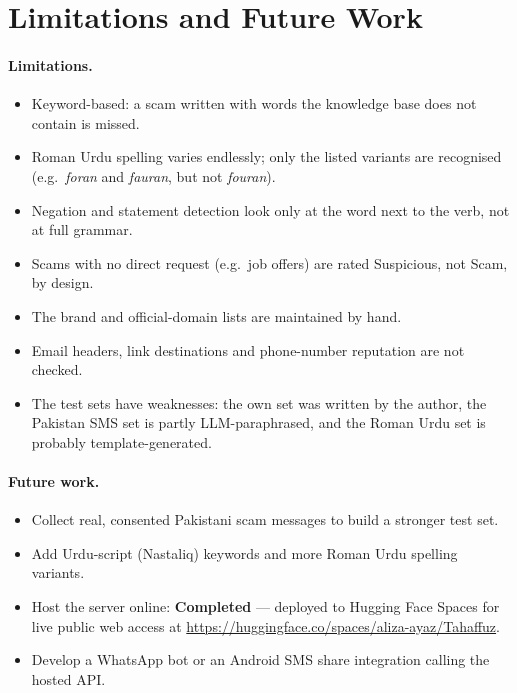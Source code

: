 \documentclass[11pt,a4paper]{article}
\begin{document}
\section{Limitations and Future Work}

\paragraph{Limitations.}
\begin{itemize}
  \item Keyword-based: a scam written with words the knowledge base does not contain is missed.
  \item Roman Urdu spelling varies endlessly; only the listed variants are recognised
        (e.g.\ \emph{foran} and \emph{fauran}, but not \emph{fouran}).
  \item Negation and statement detection look only at the word next to the verb, not at full grammar.
  \item Scams with no direct request (e.g.\ job offers) are rated Suspicious, not Scam, by design.
  \item The brand and official-domain lists are maintained by hand.
  \item Email headers, link destinations and phone-number reputation are not checked.
  \item The test sets have weaknesses: the own set was written by the author, the Pakistan SMS set is
        partly LLM-paraphrased, and the Roman Urdu set is probably template-generated.
\end{itemize}

\paragraph{Future work.}
\begin{itemize}
  \item Collect real, consented Pakistani scam messages to build a stronger test set.
  \item Add Urdu-script (Nastaliq) keywords and more Roman Urdu spelling variants.
  \item Host the server online: \textbf{Completed} --- deployed to Hugging Face Spaces for live public web access at \url{https://huggingface.co/spaces/aliza-ayaz/Tahaffuz}.
  \item Develop a WhatsApp bot or an Android SMS share integration calling the hosted API.
\end{itemize}
\end{document}
